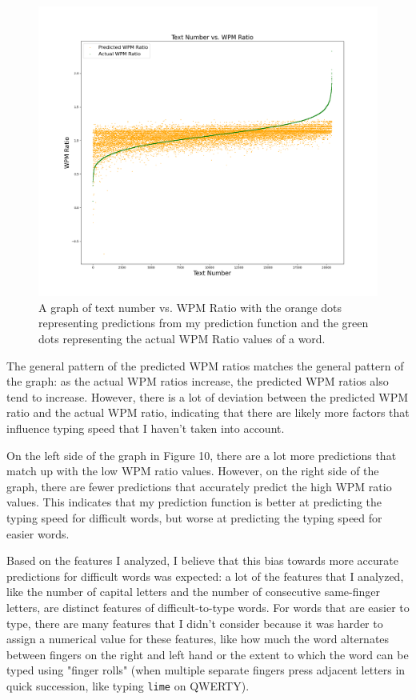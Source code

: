 \documentclass[12pt]{article}
\newcommand{\code}[1]{\texttt{#1}}
\begin{document}
\begin{figure}[H]
	\caption{A graph of text number vs. WPM Ratio with the orange dots representing predictions from my prediction function and the green dots representing the actual WPM Ratio values of a word.}
	\includegraphics[width=\textwidth]{predictions.png}
\end{figure}

The general pattern of the predicted WPM ratios matches the general pattern of the graph: as the actual WPM ratios increase, the predicted WPM ratios also tend to increase. However, there is a lot of deviation between the predicted WPM ratio and the actual WPM ratio, indicating that there are likely more factors that influence typing speed that I haven't taken into account.

On the left side of the graph in Figure 10, there are a lot more predictions that match up with the low WPM ratio values. However, on the right side of the graph, there are fewer predictions that accurately predict the high WPM ratio values. This indicates that my prediction function is better at predicting the typing speed for difficult words, but worse at predicting the typing speed for easier words.

Based on the features I analyzed, I believe that this bias towards more accurate predictions for difficult words was expected: a lot of the features that I analyzed, like the number of capital letters and the number of consecutive same-finger letters, are distinct features of difficult-to-type words. For words that are easier to type, there are many features that I didn't consider because it was harder to assign a numerical value for these features, like how much the word alternates between fingers on the right and left hand or the extent to which the word can be typed using "finger rolls" (when multiple separate fingers press adjacent letters in quick succession, like typing \code{lime} on QWERTY).
\end{document}
